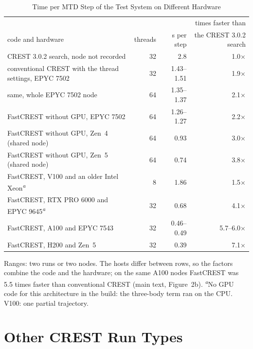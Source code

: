 \documentclass[journal=jctcce,manuscript=suppinfo]{achemso}
\begin{document}
\begin{table}[tbp]
\caption{Time per MTD Step of the Test System on Different Hardware}
\label{tab:si-hardware}
\small
\begin{tabular}{@{}L{0.50\textwidth}rrr@{}}
\toprule
 & & & times faster than \\
code and hardware & threads & s per step & the CREST 3.0.2 search \\
\midrule
CREST 3.0.2 search, node not recorded & 32 & 2.8 & 1.0$\times$ \\
conventional CREST with the thread settings, EPYC 7502 & 32 & 1.43--1.51 & 1.9$\times$ \\
same, whole EPYC 7502 node & 64 & 1.35--1.37 & 2.1$\times$ \\
FastCREST without GPU, EPYC 7502 & 64 & 1.26--1.27 & 2.2$\times$ \\
FastCREST without GPU, Zen~4 (shared node) & 64 & 0.93 & 3.0$\times$ \\
FastCREST without GPU, Zen~5 (shared node) & 64 & 0.74 & 3.8$\times$ \\
FastCREST, V100 and an older Intel Xeon\textsuperscript{\emph{a}} & 8 & 1.86 & 1.5$\times$ \\
FastCREST, RTX PRO 6000 and EPYC 9645\textsuperscript{\emph{a}} & 32 & 0.68 & 4.1$\times$ \\
FastCREST, A100 and EPYC 7543 & 32 & 0.46--0.49 & 5.7--6.0$\times$ \\
FastCREST, H200 and Zen~5 & 32 & 0.39 & 7.1$\times$ \\
\bottomrule
\end{tabular}

\smallskip
\begin{minipage}{\textwidth}\raggedright\footnotesize
Ranges: two runs or two nodes. The hosts differ between rows, so the factors combine the code and the hardware; on the
same A100 nodes FastCREST was 5.5 times faster than conventional CREST (main text, Figure~2b).
\textsuperscript{\emph{a}}No GPU code for this architecture in the build: the three-body term ran on the CPU. V100: one
partial trajectory.
\end{minipage}
\end{table}

\section{Other CREST Run Types}
\label{si:modes}
\end{document}
